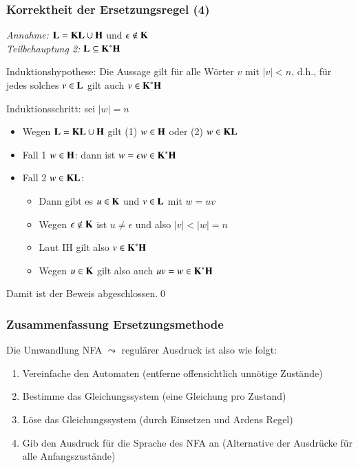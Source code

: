 \documentclass[aspectratio=1610,onlymath]{beamer}
\begin{document}
\begin{frame}[t]\frametitle{Korrektheit der Ersetzungsregel (4)}

\emph{Annahme:} $\textbf{\textcolor{black}{L}}= \textbf{\textcolor{black}{K}}\textbf{\textcolor{black}{L}}\cup\textbf{\textcolor{black}{H}}$ und $\epsilon\notin\textbf{\textcolor{black}{K}}$\\[1ex]

\emph{Teilbehauptung 2:} $\textbf{\textcolor{black}{L}}\subseteq\textbf{\textcolor{black}{K}}^*\textbf{\textcolor{black}{H}}$\\[1ex]

\medskip

\alert{Induktionshypothese:} Die Aussage gilt für alle Wörter $v$ mit $|v|<n$, d.h., für jedes solches $v\in\textbf{\textcolor{black}{L}}$ gilt auch $v\in\textbf{\textcolor{black}{K}}^*\textbf{\textcolor{black}{H}}$ \pause
\medskip

\alert{Induktionsschritt:} sei $|w|=n$\pause
\begin{itemize}
\item Wegen $\textbf{\textcolor{black}{L}}= \textbf{\textcolor{black}{K}}\textbf{\textcolor{black}{L}}\cup\textbf{\textcolor{black}{H}}$ gilt (1) $w\in\textbf{\textcolor{black}{H}}$ oder (2) $w\in \textbf{\textcolor{black}{K}}\textbf{\textcolor{black}{L}}$\pause
\item Fall 1 $w\in\textbf{\textcolor{black}{H}}$: dann ist $w=\epsilon w \in \textbf{\textcolor{black}{K}}^*\textbf{\textcolor{black}{H}}$\pause
\item Fall 2 $w\in \textbf{\textcolor{black}{K}}\textbf{\textcolor{black}{L}}$\pause:
	\begin{itemize}
	\item Dann gibt es $u\in\textbf{\textcolor{black}{K}}$ und $v\in\textbf{\textcolor{black}{L}}$ mit $w=uv$\pause
	\item Wegen $\epsilon\notin\textbf{\textcolor{black}{K}}$ ist $u\neq\epsilon$ und also $|v|<|w|=n$\pause
	\item Laut IH gilt also $v\in\textbf{\textcolor{black}{K}}^*\textbf{\textcolor{black}{H}}$\pause
	\item Wegen $u\in\textbf{\textcolor{black}{K}}$ gilt also auch $uv=w\in\textbf{\textcolor{black}{K}}^*\textbf{\textcolor{black}{H}}$
	\end{itemize}
\end{itemize}

Damit ist der Beweis abgeschlossen.\qed

\end{frame}

\begin{frame}\frametitle{Zusammenfassung Ersetzungsmethode}

Die Umwandlung NFA $\leadsto$ regulärer Ausdruck ist also wie folgt:

\begin{enumerate}[(1)]
\item \alert{Vereinfache den Automaten} (entferne offensichtlich unnötige Zustände)
\item \alert{Bestimme das Gleichungssystem} (eine Gleichung pro Zustand)
\item \alert{Löse das Gleichungssystem} (durch Einsetzen und Ardens Regel)
\item \alert{Gib den Ausdruck für die Sprache des NFA an} (Alternative der Ausdrücke für alle Anfangszustände)
\end{enumerate}

\end{frame}
\end{document}
